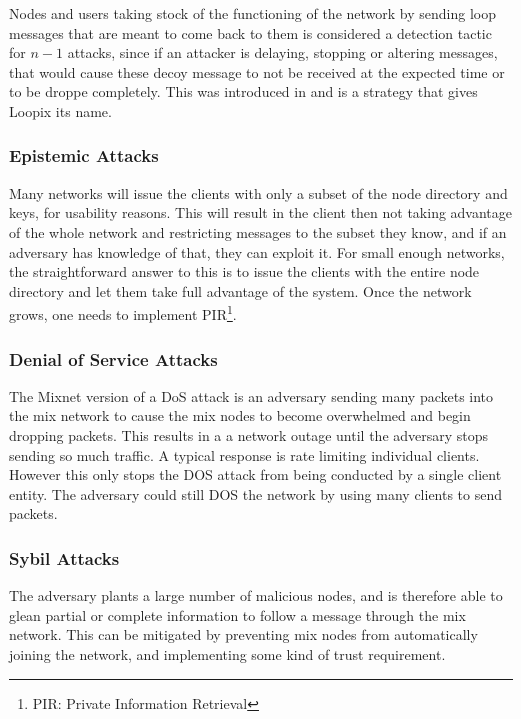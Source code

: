 \documentclass{article}
\begin{document}
Nodes and users taking stock of the functioning of the network by sending loop messages that are meant to come back to them is considered a detection tactic for $n-1$ attacks, since if an attacker is delaying, stopping or altering messages, that would cause these decoy message to not be received at the expected time or to be droppe completely. This was introduced in  and is a strategy that gives Loopix  its name.


\subsubsection{Epistemic Attacks }

Many networks will issue the clients with only a subset of the node directory and keys, for usability reasons.  This will result in the client then not taking advantage of the whole network and restricting messages to the subset they know, and if an adversary has knowledge of that, they can exploit it. For small enough networks, the straightforward answer to this is to issue the clients with the entire node directory and let them take full advantage of the system. Once the network grows, one needs to implement PIR\footnote{PIR: Private Information Retrieval}. 


\subsubsection{Denial of Service Attacks}

The Mixnet version of a DoS attack is an adversary sending many packets into the mix network to cause the mix nodes to become overwhelmed and begin dropping packets. This results in a a network outage
until the adversary stops sending so much traffic. A typical response is rate limiting individual clients. However this only stops the DOS attack from being conducted by a single client entity. The adversary could still DOS the network by using many clients to send packets.

\subsubsection{Sybil Attacks}

The adversary plants a large number of malicious nodes, and is therefore able to glean partial or complete information to follow a message through the mix network. This can be mitigated by preventing mix nodes from automatically joining the network, and implementing some kind of trust requirement.
\end{document}
